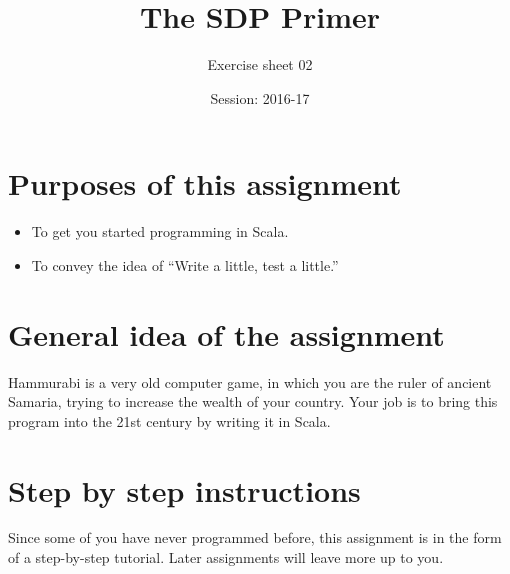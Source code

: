 \documentclass[12pt,a4paper,times]{article}
\title{The SDP Primer}
\author{Exercise sheet 02}
\date{Session: 2016-17}
\begin{document}
\maketitle
\thispagestyle{fancy}

\section{Purposes of this assignment}\label{purposes-of-this-assignment}

\begin{itemize}
\item
  To get you started programming in Scala.
\item
  To convey the idea of ``Write a little, test a little.''
\end{itemize}

\section{General idea of the
assignment}\label{general-idea-of-the-assignment}

Hammurabi is a very old computer game, in which you are the ruler of
ancient Samaria, trying to increase the wealth of your country. Your job
is to bring this program into the 21st century by writing it in Scala.

\section{Step by step instructions}\label{step-by-step-instructions}

Since some of you have never programmed before, this assignment is in
the form of a step-by-step tutorial. Later assignments will leave more
up to you.
\end{document}
